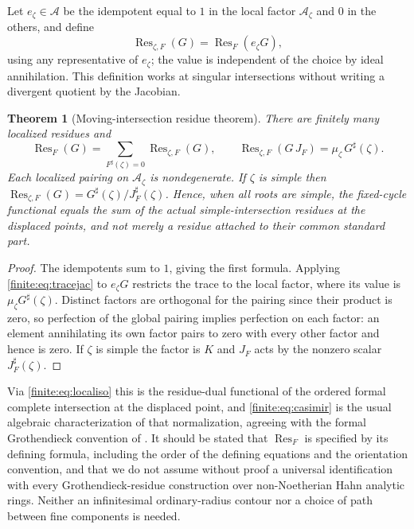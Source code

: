 \documentclass[11pt,letterpaper]{article}
\newtheorem{theorem}{Theorem}[section]
\theoremstyle{definition}
\theoremstyle{remark}
\newcommand{\Alg}{\mathcal A}
\newcommand{\sh}{^{\sharp}}
\DeclareMathOperator{\Res}{Res}
\numberwithin{equation}{section}
\begin{document}
Let $e_\zeta\in\Alg$ be the idempotent equal to $1$ in the local factor $\Alg_\zeta$ and $0$ in the others, and define
\begin{equation}\label{finite:eq:localized}
 \Res_{\zeta,F}(G)=\Res_F(e_\zeta G),
\end{equation}
using any representative of $e_\zeta$; the value is independent of the choice by ideal annihilation. This definition works at singular intersections without writing a divergent quotient by the Jacobian.

\begin{theorem}[Moving-intersection residue theorem]
\label{finite:thm:localres}
There are finitely many localized residues and
\begin{equation}\label{finite:eq:localres}
 \Res_F(G)=\sum_{F\sh(\zeta)=0}\Res_{\zeta,F}(G),
 \qquad
 \Res_{\zeta,F}(G\,J_F)=\mu_\zeta\,G\sh(\zeta).
\end{equation}
Each localized pairing on $\Alg_\zeta$ is nondegenerate. If $\zeta$ is simple then $\Res_{\zeta,F}(G)=G\sh(\zeta)/J_F\sh(\zeta)$. Hence, when all roots are simple, the fixed-cycle functional equals the sum of the actual simple-intersection residues at the displaced points, and not merely a residue attached to their common standard part.
\end{theorem}

\begin{proof}
The idempotents sum to $1$, giving the first formula. Applying \eqref{finite:eq:tracejac} to $e_\zeta G$ restricts the trace to the local factor, where its value is $\mu_\zeta G\sh(\zeta)$. Distinct factors are orthogonal for the pairing since their product is zero, so perfection of the global pairing implies perfection on each factor: an element annihilating its own factor pairs to zero with every other factor and hence is zero. If $\zeta$ is simple the factor is $K$ and $J_F$ acts by the nonzero scalar $J_F\sh(\zeta)$.
\end{proof}

Via \eqref{finite:eq:localiso} this is the residue-dual functional of the ordered formal complete intersection at the displaced point, and \eqref{finite:eq:casimir} is the usual algebraic characterization of that normalization, agreeing with the formal Grothendieck convention of \cite{finite:CDS}. It should be stated that $\Res_F$ is specified by its defining formula, including the order of the defining equations and the orientation convention, and that we do not assume without proof a universal identification with every Grothendieck-residue construction over non-Noetherian Hahn analytic rings. Neither an infinitesimal ordinary-radius contour nor a choice of path between fine components is needed.
\end{document}
